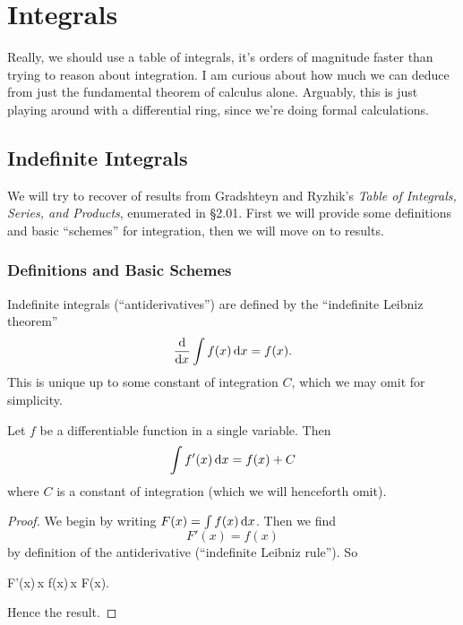\chapter{Integrals}

\M
Really, we should use a table of integrals, it's orders of magnitude
faster than trying to reason about integration. I am curious about how
much we can deduce from just the fundamental theorem of calculus alone.
Arguably, this is just playing around with a differential ring, since
we're doing formal calculations.

\section{Indefinite Integrals}

\M We will try to recover of results from
Gradshteyn and Ryzhik's \textit{Table of Integrals, Series, and Products},
enumerated in \S2.01. First we will provide some definitions and basic
``schemes'' for integration, then we will move on to results.

\subsection{Definitions and Basic Schemes}

Indefinite integrals (``antiderivatives'') are defined by the
``indefinite Leibniz theorem''
\begin{equation}
\frac{\mathrm{d}}{\mathrm{d} x}\int f(x)\,\mathrm{d} x = f(x).
\end{equation}
This is unique up to some constant of integration $C$, which we may omit
for simplicity.

\begin{theorem}\label{integrals:thm:ftc}
  Let $f$ be a differentiable function in a single variable. Then
  \[ \int f'(x)\,\mathrm{d} x = f(x) + C\]
  where $C$ is a constant of integration (which we will henceforth omit).
\end{theorem}

\begin{proof}
We begin by writing $F(x)=\int f(x)\,\mathrm{d} x$.
Then we find
\begin{equation}\label{eq:integrals:indefinite:ftc:proof-step}
F'(x) = f(x)
\end{equation}
by definition of the antiderivative (``indefinite Leibniz rule'').
So
\begin{calculation}
\int F'(x)\,\D x
\int f(x)\,\D x
F(x).
\end{calculation}
Hence the result.
\end{proof}

